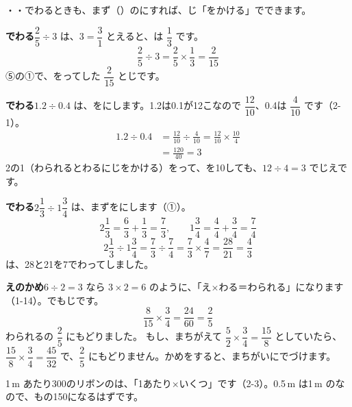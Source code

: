 \leavevmode\label{bk:2-4:iroiro}・・でわるときも、まず（）のにすれば、じ「をかける」でできます。

\textbf{でわる}\quad $\dfrac{2}{5}\div3$ は、$3=\dfrac{3}{1}$ とえると、は $\dfrac{1}{3}$ です。
\[ \frac{2}{5}\div3=\frac{2}{5}\times\frac{1}{3}=\frac{2}{15} \]
⑤の①で、をってした $\dfrac{2}{15}$ とじです。

\textbf{でわる}\quad $1.2\div0.4$ は、をにします。1.2は0.1が12こなので $\dfrac{12}{10}$、0.4は $\dfrac{4}{10}$ です（2-1）。
\begin{align*}
1.2\div0.4&=\frac{12}{10}\div\frac{4}{10}=\frac{12}{10}\times\frac{10}{4}\\
&=\frac{120}{40}=3
\end{align*}
2の1（わられるとわるにじをかける）をって、を10しても、$12\div4=3$ でじえです。

\textbf{でわる}\quad $2\dfrac{1}{3}\div1\dfrac{3}{4}$ は、まずをにします（①）。
\[ 2\frac{1}{3}=\frac{6}{3}+\frac{1}{3}=\frac{7}{3},\qquad 1\frac{3}{4}=\frac{4}{4}+\frac{3}{4}=\frac{7}{4} \]
\[ 2\frac{1}{3}\div1\frac{3}{4}=\frac{7}{3}\div\frac{7}{4}=\frac{7}{3}\times\frac{4}{7}=\frac{28}{21}=\frac{4}{3} \]
は、28と21を7でわってしました。

\textbf{えのかめ}\quad $6\div2=3$ なら $3\times2=6$ のように、「え×わる＝わられる」になります（1-14）。でもじです。
\[ \frac{8}{15}\times\frac{3}{4}=\frac{24}{60}=\frac{2}{5} \]
わられるの $\dfrac{2}{5}$ にもどりました。
もし、まちがえて $\dfrac{5}{2}\times\dfrac{3}{4}=\dfrac{15}{8}$ としていたら、$\dfrac{15}{8}\times\dfrac{3}{4}=\dfrac{45}{32}$ で、$\dfrac{2}{5}$ にもどりません。かめをすると、まちがいにでづけます。


\leavevmode\label{bk:2-4:chiisai}1\,m あたり300のリボンのは、「1あたり×いくつ」です（2-3）。0.5\,m は1\,m のなので、もの150になるはずです。


